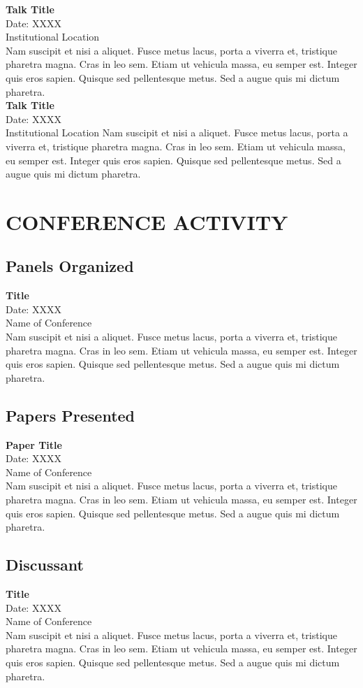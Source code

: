 \documentclass[a4paper,9pt]{extarticle}
\begin{document}
\noindent
\textbf{Talk Title} \\ 
Date: XXXX \\
Institutional Location \\
Nam suscipit et nisi a aliquet. Fusce metus lacus, porta a viverra et, tristique pharetra magna. Cras in leo sem. Etiam ut vehicula massa, eu semper est. Integer quis eros sapien. Quisque sed pellentesque metus. Sed a augue quis mi dictum pharetra. \\

\noindent
\textbf{Talk Title} \\ 
Date: XXXX \\
Institutional Location 
Nam suscipit et nisi a aliquet. Fusce metus lacus, porta a viverra et, tristique pharetra magna. Cras in leo sem. Etiam ut vehicula massa, eu semper est. Integer quis eros sapien. Quisque sed pellentesque metus. Sed a augue quis mi dictum pharetra. 


\section*{CONFERENCE ACTIVITY}
\subsection*{Panels Organized}
\textbf{Title} \\
Date: XXXX \\
Name of Conference \\
Nam suscipit et nisi a aliquet. Fusce metus lacus, porta a viverra et, tristique pharetra magna. Cras in leo sem. Etiam ut vehicula massa, eu semper est. Integer quis eros sapien. Quisque sed pellentesque metus. Sed a augue quis mi dictum pharetra. 

\subsection*{Papers Presented}
\textbf{Paper Title} \\
Date: XXXX \\
Name of Conference \\
Nam suscipit et nisi a aliquet. Fusce metus lacus, porta a viverra et, tristique pharetra magna. Cras in leo sem. Etiam ut vehicula massa, eu semper est. Integer quis eros sapien. Quisque sed pellentesque metus. Sed a augue quis mi dictum pharetra.

\subsection*{Discussant}
\textbf{Title} \\
Date: XXXX \\
Name of Conference \\
Nam suscipit et nisi a aliquet. Fusce metus lacus, porta a viverra et, tristique pharetra magna. Cras in leo sem. Etiam ut vehicula massa, eu semper est. Integer quis eros sapien. Quisque sed pellentesque metus. Sed a augue quis mi dictum pharetra. 
\end{document}
